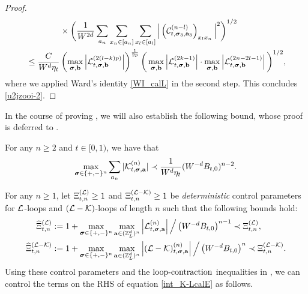 \begin{proof}
\begin{align*}
 &\qquad \qquad \times \bigg(\frac{1}{W^{2d}}\sum_{a_n}\sum_{x_n\in\br{a_n}}\sum_{x_l\in\br{a_l}}\Big|\p{{\cal C}^{(n-l)}_{t, \bsig_3, \ba_3}}_{x_l x_n}\Big|^2\bigg)^{1/2}   \\
&\le \frac{C}{W^d\eta_t}\left(\max_{\bsig,\bfb}   \left|{\cal L}^{(2(l-k)p)}_{t, \bsig, \bfb}\right|\right)^{\frac1{2p}} \bigg(\max_{\bsig,\bfb}  \left|{\cal L}^{(2k-1)}_{t, \bsig, \bfb}\right|\cdot \max_{\bsig,\bfb}  \left|{\cal L}^{(2n-2l-1)}_{t, \bsig, \bfb}\right| \bigg)^{1/2},
\end{align*}
where we applied Ward's identity \eqref{WI_calL} in the second step. This concludes \eqref{u2jzooi-2}.
\end{proof}

In the course of proving , we will also establish the following bound, whose proof is deferred to .

\begin{lemma}\label{lem_wardineq_K}
For any $n\ge 2$ and $t\in[0,1)$, we have that
\begin{align}\label{wardineq_K}
  \max_{\bsig\in\{+,-\}^n}\sum_{a_n} |{\cal K}^{(n)}_{t, \bsig, \ba}|\prec \frac 1 {W^{d}\eta_t} (W^{-d}B_{t,0})^{n-2}.  
\end{align} 
\end{lemma}
 

For any $n\ge 1$, let $\Xi^{({\cal L})}_{t, n}\ge 1$ and $\Xi^{({\cal L}-{\cal K})}_{t, n}\ge 1$ be \emph{deterministic} control parameters for $\cL$-loops and $(\cL-\cK)$-loops of length $n$ such that the following bounds hold: 
\begin{align}\label{def:XiL}
	\wh\Xi^{({\cal L})}_{t, n} &:= 1+ \max_{\bsig\in \{+, -\}^n}\max_{\ba\in (\Zn)^n} \left|{\cal L}^{(n)}_{t, \bsig, \ba} \right|\Big/ \left(W^{-d}B_{t,0}\right)^{n-1}\prec \Xi^{({\cal L})}_{t, n},\\
\wh\Xi^{({\cal L}-{\cal K})}_{t, n} &:=1+\max_{\bsig\in \{+, -\}^n}\max_{\ba\in (\Zn)^n} \left|({\cal L}-{\cal K})^{(n)}_{t, \bsig, \ba} \right|\Big/\left(W^{-d}B_{t,0}\right)^{n} \prec \Xi^{({\cal L}-{\cal K})}_{t, n}.\label{def:XIL-K}
\end{align}
Using these control parameters and the $\contract$ inequalities in , we can control the terms on the RHS of equation \eqref{int_K-LcalE} as follows. 
  
